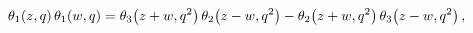 \[\mathop{\theta_{1}\/}\nolimits\!\left(z,q\right)\mathop{\theta_{1}\/}\nolimits%
\!\left(w,q\right)=\mathop{\theta_{3}\/}\nolimits\!\left(z+w,q^{2}\right)%
\mathop{\theta_{2}\/}\nolimits\!\left(z-w,q^{2}\right)-\mathop{\theta_{2}\/}%
\nolimits\!\left(z+w,q^{2}\right)\mathop{\theta_{3}\/}\nolimits\!\left(z-w,q^{%
2}\right),\]